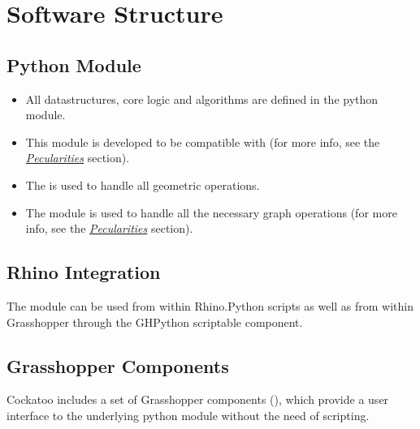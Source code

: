 \documentclass[letterpaper,10pt,english]{sphinxmanual}
\begin{document}
\section{Software Structure}
\label{\detokenize{README:software-structure}}

\subsection{Python Module}
\label{\detokenize{README:python-module}}\begin{itemize}
\item {} 
All datastructures, core logic and algorithms are defined in the
 python module.

\item {} 
This module is developed to be compatible with
 (for more info, see the
{\hyperref[\detokenize{README:pecularities}]{\emph{Pecularities}}} section).

\item {} 
The 
is used to handle all geometric operations.

\item {} 
The  module is used to handle all the necessary graph
operations (for more info, see the {\hyperref[\detokenize{README:pecularities}]{\emph{Pecularities}}}
section).

\end{itemize}


\subsection{Rhino Integration}
\label{\detokenize{README:rhino-integration}}
The  module can be used from within Rhino.Python scripts as
well as from within Grasshopper through the GHPython scriptable
component.


\subsection{Grasshopper Components}
\label{\detokenize{README:grasshopper-components}}
Cockatoo includes a set of Grasshopper components (),
which provide a user interface to the underlying python module without
the need of scripting.
\end{document}
